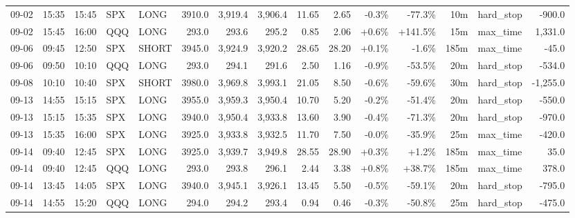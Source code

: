 \documentclass[11pt,a4paper,twoside]{article}
\begin{document}
\begin{landscape}
\begin{center}
\begin{longtable}{>{\color{txtmain}}l l l l l r r r r r r r r >{\color{txtmain}}l r}
09-02 & 15:35 & 15:45 & SPX & LONG & 3910.0 & 3,919.4 & 3,906.4 & 11.65 & 2.65 & \textcolor{lossred}{-0.3\%} & \textcolor{lossred}{-77.3\%} & 10m & hard\_stop & \textcolor{lossred}{-900.0} \\
09-02 & 15:45 & 16:00 & QQQ & LONG & 293.0 & 293.6 & 295.2 & 0.85 & 2.06 & \textcolor{wingreen}{+0.6\%} & \textcolor{wingreen}{+141.5\%} & 15m & max\_time & \textcolor{wingreen}{1,331.0} \\
09-06 & 09:45 & 12:50 & SPX & SHORT & 3945.0 & 3,924.9 & 3,920.2 & 28.65 & 28.20 & \textcolor{wingreen}{+0.1\%} & \textcolor{lossred}{-1.6\%} & 185m & max\_time & \textcolor{lossred}{-45.0} \\
09-06 & 09:50 & 10:10 & QQQ & LONG & 293.0 & 294.1 & 291.6 & 2.50 & 1.16 & \textcolor{lossred}{-0.9\%} & \textcolor{lossred}{-53.5\%} & 20m & hard\_stop & \textcolor{lossred}{-534.0} \\
09-08 & 10:10 & 10:40 & SPX & SHORT & 3980.0 & 3,969.8 & 3,993.1 & 21.05 & 8.50 & \textcolor{lossred}{-0.6\%} & \textcolor{lossred}{-59.6\%} & 30m & hard\_stop & \textcolor{lossred}{-1,255.0} \\
09-13 & 14:55 & 15:15 & SPX & LONG & 3955.0 & 3,959.3 & 3,950.4 & 10.70 & 5.20 & \textcolor{lossred}{-0.2\%} & \textcolor{lossred}{-51.4\%} & 20m & hard\_stop & \textcolor{lossred}{-550.0} \\
09-13 & 15:15 & 15:35 & SPX & LONG & 3940.0 & 3,950.4 & 3,933.8 & 13.60 & 3.90 & \textcolor{lossred}{-0.4\%} & \textcolor{lossred}{-71.3\%} & 20m & hard\_stop & \textcolor{lossred}{-970.0} \\
09-13 & 15:35 & 16:00 & SPX & LONG & 3925.0 & 3,933.8 & 3,932.5 & 11.70 & 7.50 & \textcolor{lossred}{-0.0\%} & \textcolor{lossred}{-35.9\%} & 25m & max\_time & \textcolor{lossred}{-420.0} \\
09-14 & 09:40 & 12:45 & SPX & LONG & 3925.0 & 3,939.7 & 3,949.8 & 28.55 & 28.90 & \textcolor{wingreen}{+0.3\%} & \textcolor{wingreen}{+1.2\%} & 185m & max\_time & \textcolor{wingreen}{35.0} \\
09-14 & 09:40 & 12:45 & QQQ & LONG & 293.0 & 293.8 & 296.1 & 2.44 & 3.38 & \textcolor{wingreen}{+0.8\%} & \textcolor{wingreen}{+38.7\%} & 185m & max\_time & \textcolor{wingreen}{378.0} \\
09-14 & 13:45 & 14:05 & SPX & LONG & 3940.0 & 3,945.1 & 3,926.1 & 13.45 & 5.50 & \textcolor{lossred}{-0.5\%} & \textcolor{lossred}{-59.1\%} & 20m & hard\_stop & \textcolor{lossred}{-795.0} \\
09-14 & 14:55 & 15:20 & QQQ & LONG & 294.0 & 294.2 & 293.4 & 0.94 & 0.46 & \textcolor{lossred}{-0.3\%} & \textcolor{lossred}{-50.8\%} & 25m & hard\_stop & \textcolor{lossred}{-475.0} \\

\end{longtable}
\end{center}
\end{landscape}
\end{document}
